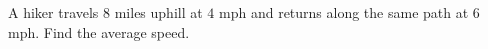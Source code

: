 A hiker travels $8$ miles uphill at $4$ mph and returns along the same path at $6$ mph. Find the average speed.
